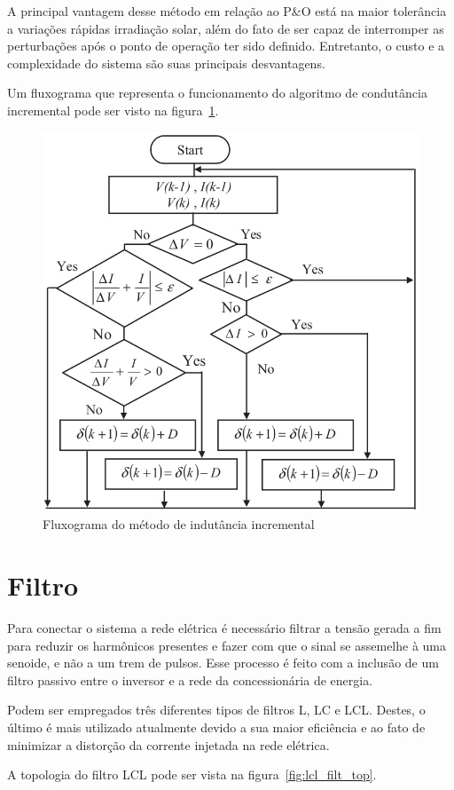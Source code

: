 \documentclass[
	12pt,				%
	openright,			%
	onseside,
	a4paper,			%
	english,			%
	french,				%
	spanish,			%
	brazil,				%
	]{abntex2}
\begin{document}
A principal vantagem desse método em relação ao P\&O está na maior tolerância a variações rápidas irradiação solar, além do fato de ser capaz de interromper as perturbações após o ponto de operação ter sido definido. Entretanto, o custo e a complexidade do sistema são suas principais desvantagens\cite{MPPT_P&O_IC}.

Um fluxograma que representa o funcionamento do algoritmo de condutância incremental pode ser visto na figura~\ref{fig:IncCond_Flux}.

\begin{figure}[htbp]
	\begin{center}
		\includegraphics[width=0.55 \linewidth]{incCond_flow}
		\caption{Fluxograma do método de indutância incremental \cite{Talha_MPPT}}
		\label{fig:IncCond_Flux}
	\end{center}
\end{figure}

\section{Filtro}

Para conectar o sistema a rede elétrica é necessário filtrar a tensão gerada a fim para reduzir os harmônicos presentes e fazer com que o sinal se assemelhe à uma senoide, e não a um trem de pulsos. Esse processo é feito com a inclusão de um filtro passivo entre o inversor e a rede da concessionária de energia.

Podem ser empregados três diferentes tipos de filtros L, LC e LCL. Destes, o último é mais utilizado atualmente devido a sua maior eficiência e ao fato de minimizar a distorção da corrente injetada na rede elétrica\cite{LCL_FILTER}\cite{LCL_FILTER_Reznik}.

A topologia do filtro LCL pode ser vista na figura~\ref{fig:lcl_filt_top}.
\end{document}
